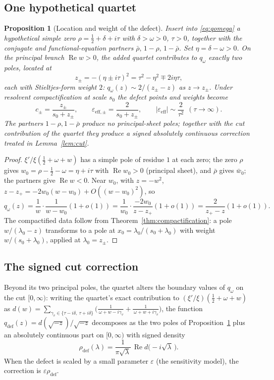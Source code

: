 \documentclass[11pt]{amsart}
\newtheorem{proposition}[theorem]{Proposition}
\theoremstyle{definition}
\theoremstyle{remark}
\newcommand{\eps}{\varepsilon}
\DeclareMathOperator{\Rea}{Re}
\begin{document}
\subsection{One hypothetical quartet}

\begin{proposition}[Location and weight of the defect]\label{prop:quartet}
Insert into \eqref{eq:qomega} a hypothetical simple zero
$\rho=\tfrac12+\delta+i\tau$ with $\delta>\omega>0$, $\tau>0$, together with
the conjugate and functional-equation partners
$\bar\rho,\,1-\rho,\,1-\bar\rho$. Set $\eta=\delta-\omega>0$. On the
principal branch $\Rea w>0$, the added quartet contributes to $q_\omega$
exactly two poles, located at
\[
z_\pm=-(\eta\pm i\tau)^2=\tau^2-\eta^2\mp 2i\eta\tau ,
\]
each with Stieltjes-form weight $2$:
$q_\omega(z)\sim 2/(z_\pm-z)$ as $z\to z_\pm$. Under resolvent
compactification at scale $s_0$ the defect points and weights become
\[
c_\pm=\frac{z_\pm}{s_0+z_\pm},
\qquad
\eps_{\mathrm{eff},\pm}=\frac{2}{s_0+z_\pm},
\qquad
|\eps_{\mathrm{eff}}|\sim\frac{2}{\tau^2}\ \ (\tau\to\infty).
\]
The partners $1-\rho,1-\bar\rho$ produce no principal-sheet poles; together
with the cut contribution of the quartet they produce a signed absolutely
continuous correction treated in Lemma~\ref{lem:cut}.
\end{proposition}

\begin{proof}
$\xi'/\xi(\tfrac12+\omega+w)$ has a simple pole of residue $1$ at each zero;
the zero $\rho$ gives $w_0=\rho-\tfrac12-\omega=\eta+i\tau$ with
$\Rea w_0>0$ (principal sheet), and $\bar\rho$ gives $\bar w_0$; the
partners give $\Rea w<0$. Near $w_0$, with $z=-w^2$,
$z-z_+=-2w_0(w-w_0)+O((w-w_0)^2)$, so
\[
q_\omega(z)=\frac{1}{w}\cdot\frac{1}{w-w_0}(1+o(1))
=\frac{1}{w_0}\cdot\frac{-2w_0}{z-z_+}(1+o(1))
=\frac{2}{z_+-z}(1+o(1)).
\]
The compactified data follow from Theorem~\ref{thm:compactification}: a pole
$w/(\lambda_0-z)$ transforms to a pole at $x_0=\lambda_0/(s_0+\lambda_0)$
with weight $w/(s_0+\lambda_0)$, applied at $\lambda_0=z_\pm$.
\end{proof}

\subsection{The signed cut correction}

Beyond its two principal poles, the quartet alters the boundary values of
$q_\omega$ on the cut $[0,\infty)$: writing the quartet's exact contribution
to $(\xi'/\xi)(\tfrac12+\omega+w)$ as
$d(w)=\sum_{\gamma_v\in\{\tau-i\delta,\ \tau+i\delta\}}
\big(\tfrac1{\,\omega+w-i\gamma_v}+\tfrac1{\,\omega+w+i\gamma_v}\big)$,
the function $q_{\mathrm{def}}(z)=d(\sqrt{-z})/\sqrt{-z}$ decomposes as the
two poles of Proposition~\ref{prop:quartet} plus an absolutely continuous
part on $[0,\infty)$ with signed density
\begin{equation}\label{eq:cutdensity}
\rho_{\mathrm{def}}(\lambda)
=\frac{1}{\pi\sqrt{\lambda}}\,\Rea d\big(-i\sqrt\lambda\,\big) .
\end{equation}
When the defect is scaled by a small parameter $\eps$ (the sensitivity
model), the correction is $\eps\rho_{\mathrm{def}}$.
\end{document}
